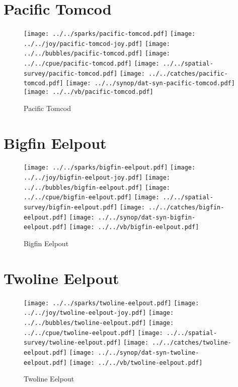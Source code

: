 \section{Pacific Tomcod}

\begin{figure}[htbp]
\centering
\texttt{[image: ../../sparks/pacific-tomcod.pdf]}
\texttt{[image: ../../joy/pacific-tomcod-joy.pdf]}
\texttt{[image: ../../bubbles/pacific-tomcod.pdf]}
\texttt{[image: ../../cpue/pacific-tomcod.pdf]}
\texttt{[image: ../../spatial-survey/pacific-tomcod.pdf]}
\texttt{[image: ../../catches/pacific-tomcod.pdf]}
\texttt{[image: ../../synop/dat-syn-pacific-tomcod.pdf]}
\texttt{[image: ../../vb/pacific-tomcod.pdf]}
\caption{Pacific Tomcod}
\end{figure}
\clearpage
\section{Bigfin Eelpout}

\begin{figure}[htbp]
\centering
\texttt{[image: ../../sparks/bigfin-eelpout.pdf]}
\texttt{[image: ../../joy/bigfin-eelpout-joy.pdf]}
\texttt{[image: ../../bubbles/bigfin-eelpout.pdf]}
\texttt{[image: ../../cpue/bigfin-eelpout.pdf]}
\texttt{[image: ../../spatial-survey/bigfin-eelpout.pdf]}
\texttt{[image: ../../catches/bigfin-eelpout.pdf]}
\texttt{[image: ../../synop/dat-syn-bigfin-eelpout.pdf]}
\texttt{[image: ../../vb/bigfin-eelpout.pdf]}
\caption{Bigfin Eelpout}
\end{figure}
\clearpage
\section{Twoline Eelpout}

\begin{figure}[htbp]
\centering
\texttt{[image: ../../sparks/twoline-eelpout.pdf]}
\texttt{[image: ../../joy/twoline-eelpout-joy.pdf]}
\texttt{[image: ../../bubbles/twoline-eelpout.pdf]}
\texttt{[image: ../../cpue/twoline-eelpout.pdf]}
\texttt{[image: ../../spatial-survey/twoline-eelpout.pdf]}
\texttt{[image: ../../catches/twoline-eelpout.pdf]}
\texttt{[image: ../../synop/dat-syn-twoline-eelpout.pdf]}
\texttt{[image: ../../vb/twoline-eelpout.pdf]}
\caption{Twoline Eelpout}
\end{figure}
\clearpage
